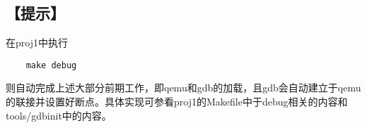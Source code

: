 \subsection{【提示】}\label{ux63d0ux793a}

在proj1中执行

\begin{lstlisting}
    make debug
\end{lstlisting}

则自动完成上述大部分前期工作，即qemu和gdb的加载，且gdb会自动建立于qemu的联接并设置好断点。具体实现可参看proj1的Makefile中于debug相关的内容和tools/gdbinit中的内容。
